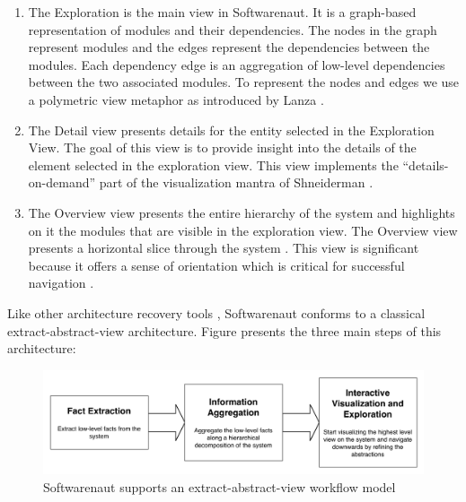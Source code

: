 \documentclass[preprint,12pt]{elsarticle}
\begin{document}
\begin{enumerate}
\item The Exploration is the main view in Softwarenaut. It is a graph-based representation of modules and their dependencies. The nodes in the graph represent modules and the edges represent the dependencies between the modules. Each dependency edge is an aggregation of low-level dependencies between the two associated modules. To represent the nodes and edges we use a polymetric view metaphor as introduced by Lanza \cite{lanza-pv, lanza-oomp}. 

\item The Detail view presents details for the entity selected in the Exploration View. The goal of this view is to provide insight into the details of the element selected in the exploration view. This view implements the ``details-on-demand'' part of the visualization mantra of Shneiderman \cite{shneid-eyes}.

\item The Overview view presents the entire hierarchy of the system and highlights on it the modules that are visible in the exploration view. The Overview view presents a horizontal slice through the system \cite{wong-thesis}. %
This view is significant because it offers a sense of orientation which is critical for successful navigation \cite{storey-awareness}.

\end{enumerate}


Like other architecture recovery tools \cite{pollet-sar}, Softwarenaut conforms to a classical extract-abstract-view architecture. Figure  presents the three main steps of this architecture:

\begin{figure}[h]
\begin{center}
\includegraphics[width=\linewidth]{images/SnautFlow}
\caption{Softwarenaut supports an extract-abstract-view workflow model}
\end{center}
\end{figure}
\end{document}

